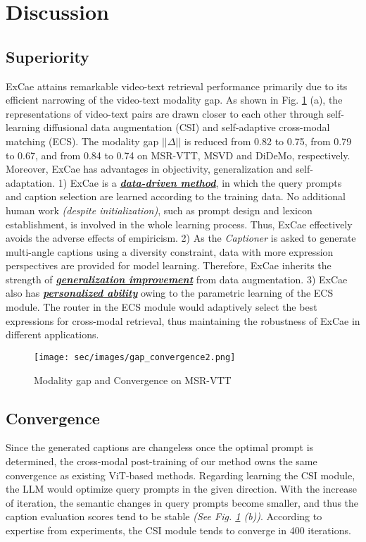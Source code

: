 \section{Discussion}
\subsection{Superiority}
ExCae attains remarkable video-text retrieval performance primarily due to its efficient narrowing of the video-text modality gap. As shown in Fig. \ref{fig:convergence} (a), the representations of video-text pairs are drawn closer to each other through self-learning diffusional data augmentation (CSI) and self-adaptive cross-modal matching  (ECS).
The modality gap $||\Delta||$ \cite{liang2022mind} is reduced from 0.82 to 0.75, from 0.79 to 0.67, and from 0.84 to 0.74 on MSR-VTT, MSVD and DiDeMo, respectively.  
Moreover, ExCae has advantages in objectivity, generalization and self-adaptation.
1) ExCae is a \underline{\textit{\textbf{data-driven method}}}, in which the query prompts and caption selection are learned according to the training data. No additional human work \textit{(despite initialization)}, such as prompt design and lexicon establishment, is involved in the whole learning process. Thus, ExCae effectively avoids the adverse effects of empiricism.
2) As the \textit{Captioner} is asked to generate multi-angle captions using a diversity constraint, data with more expression perspectives are provided for model learning. Therefore, ExCae inherits the strength of \underline{\textit{\textbf{generalization improvement}}} from data augmentation.
3) ExCae also has \underline{\textit{\textbf{personalized ability}}} owing to the parametric learning of the ECS module. The router in the ECS module would adaptively select the best expressions for cross-modal retrieval, thus maintaining the robustness of ExCae in different applications. 



\begin{figure}[t]
\centering
\texttt{[image: sec/images/gap\_convergence2.png]} 
\caption{Modality gap and Convergence on MSR-VTT}
\label{fig:convergence}
\end{figure}


\subsection{Convergence}
Since the generated captions are changeless once the optimal prompt is determined, the cross-modal post-training of our method owns the same convergence as existing ViT-based methods. 
Regarding learning the CSI module, the LLM would optimize query prompts in the given direction. With the increase of iteration, the semantic changes in query prompts become smaller, and thus the caption evaluation scores tend to be stable \textit{(See Fig. \ref{fig:convergence} (b))}.
According to expertise from experiments, the CSI module tends to converge in 400 iterations.


